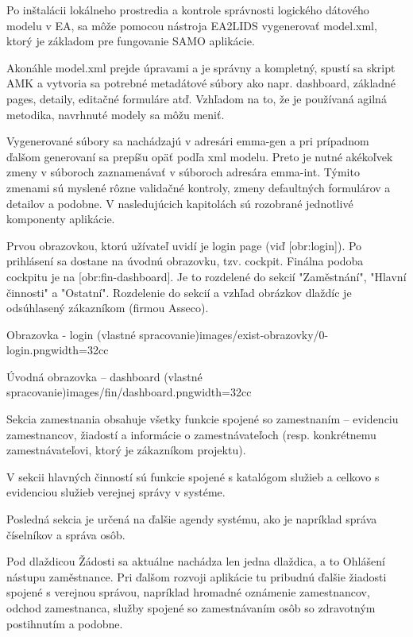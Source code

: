 Po inštalácii lokálneho prostredia a kontrole správnosti logického dátového modelu v EA, sa môže pomocou nástroja EA2LIDS vygenerovať model.xml, ktorý je základom pre fungovanie SAMO aplikácie. 

Akonáhle model.xml prejde úpravami a je správny a kompletný, spustí sa skript AMK a vytvoria sa potrebné metadátové súbory ako napr. dashboard, základné pages, detaily, editačné formuláre atď. Vzhľadom na to, že je používaná agilná metodika, navrhnuté modely sa môžu meniť.

Vygenerované súbory sa nachádzajú v adresári emma-gen a pri prípadnom ďalšom generovaní sa prepíšu opäť podľa xml modelu. Preto je nutné akékoľvek zmeny v súboroch zaznamenávať v súboroch adresára emma-int. Týmito zmenami sú myslené rôzne validačné kontroly, zmeny defaultných formulárov a detailov a podobne. V nasledujúcich kapitolách sú rozobrané jednotlivé komponenty aplikácie.

Prvou obrazovkou, ktorú užívateľ uvidí je login page (viď [obr:login]). Po prihlásení sa dostane na úvodnú obrazovku, tzv. cockpit. Finálna podoba cockpitu je na [obr:fin-dashboard]. Je to rozdelené do sekcií "Zaměstnání", "Hlavní činnosti" a "Ostatní". Rozdelenie do sekcií a vzhľad obrázkov dlaždíc je odsúhlasený zákazníkom (firmou Asseco).

{Obrazovka - login (vlastné spracovanie)}{images/exist-obrazovky/0-login.png}{width=32cc} 

{Úvodná obrazovka -- dashboard (vlastné spracovanie)}{images/fin/dashboard.png}{width=32cc}

Sekcia zamestnania obsahuje všetky funkcie spojené so zamestnaním -- evidenciu zamestnancov, žiadostí a informácie o zamestnávateľoch (resp. konkrétnemu zamestnávateľovi, ktorý je zákazníkom projektu). 

V sekcii hlavných činností sú funkcie spojené s katalógom služieb a celkovo s evidenciou služieb verejnej správy v systéme. 

Posledná sekcia je určená na ďalšie agendy systému, ako je napríklad správa číselníkov a správa osôb.


Pod dlaždicou Žádosti sa aktuálne nachádza len jedna dlaždica, a to Ohlášení nástupu zaměstnance. Pri ďalšom rozvoji aplikácie tu pribudnú ďalšie žiadosti spojené s verejnou správou, napríklad hromadné oznámenie zamestnancov, odchod zamestnanca, služby spojené so zamestnávaním osôb so zdravotným postihnutím a podobne.

